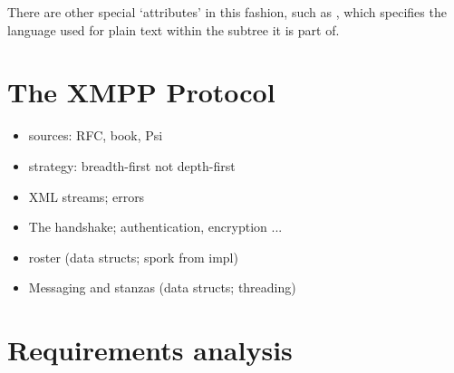 There are other special `attributes' in this fashion, such as , which specifies the language used for plain text within the subtree it is part of.

\section{The XMPP Protocol}
\begin{itemize}
  \item sources: RFC, book, Psi
  \item strategy: breadth-first not depth-first
  \item XML streams; errors
  \item The handshake; authentication, encryption ...
  \item roster (data structs; spork from impl)
  \item Messaging and stanzas (data structs; threading)
\end{itemize}

\section{Requirements analysis}
